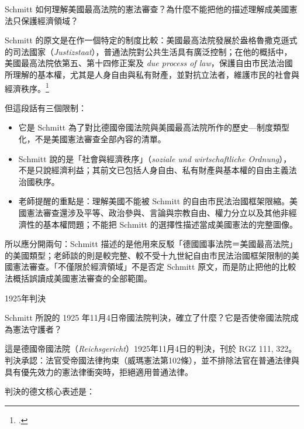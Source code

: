 \begin{qaquestion}
Schmitt 如何理解美國最高法院的憲法審查？為什麼不能把他的描述理解成美國憲法只保護經濟領域？
\end{qaquestion}

Schmitt 的原文是在作一個特定的制度比較：美國最高法院發展於盎格魯撒克遜式的司法國家（\emph{Justizstaat}），普通法院對公共生活具有廣泛控制；在他的概括中，美國最高法院依第五、第十四修正案及 \emph{due process of law}，保護自由市民法治國所理解的基本權，尤其是人身自由與私有財產，並對抗立法者，維護市民的社會與經濟秩序。\footcites[80--82]{schmitt2015}[13--16]{schmitt1931}

但這段話有三個限制：

\begin{itemize}
\tightlist
\item
  它是 Schmitt 為了對比德國帝國法院與美國最高法院所作的歷史---制度類型化，不是美國憲法審查全部內容的清單。
\item
  Schmitt 說的是「社會與經濟秩序」（\emph{soziale und wirtschaftliche Ordnung}），不是只說經濟利益；其前文已包括人身自由、私有財產與基本權的自由主義法治國秩序。
\item
  老師提醒的重點是：理解美國不能被 Schmitt 的自由市民法治國框架限縮。美國憲法審查還涉及平等、政治參與、言論與宗教自由、權力分立以及其他非經濟性的基本權問題；不能把 Schmitt 的選擇性描述當成美國憲法的完整圖像。
\end{itemize}

所以應分開兩句：Schmitt 描述的是他用來反駁「德國國事法院＝美國最高法院」的美國類型；老師談的則是較完整、較不受十九世紀自由市民法治國框架限制的美國憲法審查。「不僅限於經濟領域」不是否定 Schmitt 原文，而是防止把他的比較法概括誤讀成美國憲法審查的全部範圍。


\begin{qaprompt}
1925年判決
\end{qaprompt}

\begin{qaquestion}
Schmitt 所說的 1925 年11月4日帝國法院判決，確立了什麼？它是否使帝國法院成為憲法守護者？
\end{qaquestion}

這是德國帝國法院（\emph{Reichsgericht}）1925年11月4日的判決，刊於 RGZ 111, 322。判決承認：法官受帝國法律拘束（威瑪憲法第102條），並不排除法官在普通法律與具有優先效力的憲法律衝突時，拒絕適用普通法律。

判決的德文核心表述是：

